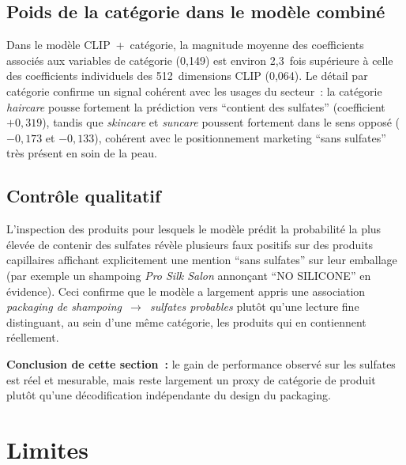 \documentclass[11pt,a4paper]{article}
\begin{document}
\subsection{Poids de la catégorie dans le modèle combiné}

Dans le modèle CLIP~+~catégorie, la magnitude moyenne des coefficients associés aux variables de catégorie (0{,}149) est environ 2{,}3~fois supérieure à celle des coefficients individuels des 512~dimensions CLIP (0{,}064). Le détail par catégorie confirme un signal cohérent avec les usages du secteur~: la catégorie \emph{haircare} pousse fortement la prédiction vers ``contient des sulfates'' (coefficient~$+0{,}319$), tandis que \emph{skincare} et \emph{suncare} poussent fortement dans le sens opposé ($-0{,}173$ et $-0{,}133$), cohérent avec le positionnement marketing ``sans sulfates'' très présent en soin de la peau.

\subsection{Contrôle qualitatif}

L'inspection des produits pour lesquels le modèle prédit la probabilité la plus élevée de contenir des sulfates révèle plusieurs faux positifs sur des produits capillaires affichant explicitement une mention ``sans sulfates'' sur leur emballage (par exemple un shampoing \emph{Pro Silk Salon} annonçant ``NO SILICONE'' en évidence). Ceci confirme que le modèle a largement appris une association \emph{packaging de shampoing~$\rightarrow$~sulfates probables} plutôt qu'une lecture fine distinguant, au sein d'une même catégorie, les produits qui en contiennent réellement.

\textbf{Conclusion de cette section~:} le gain de performance observé sur les sulfates est réel et mesurable, mais reste largement un proxy de catégorie de produit plutôt qu'une décodification indépendante du design du packaging.

\section{Limites}
\end{document}
